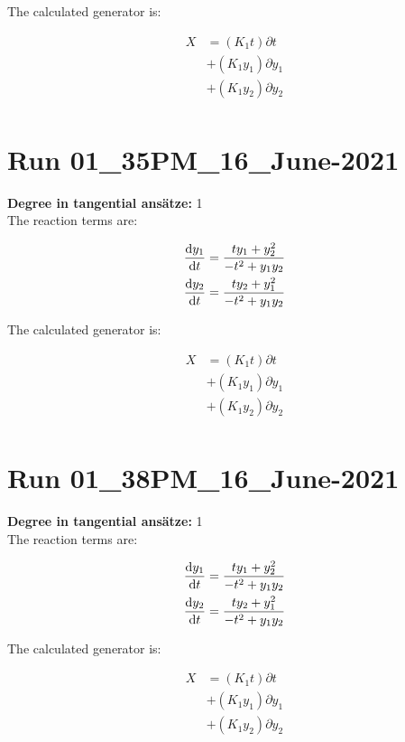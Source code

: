 The calculated generator is:

\begin{align*}
X&=\left(K_{1} t\right)\partial t\\&+\left(K_{1} y_{1}\right)\partial y_{1}\\&+\left(K_{1} y_{2}\right)\partial y_{2}\\\end{align*}
\section*{Run 01\_35PM\_16\_June-2021}
\textbf{Degree in tangential ansätze:}	1\\
The reaction terms are:

\begin{align*}
\dv{y_{1}}{t}&=\frac{t y_{1} + y_{2}^{2}}{- t^{2} + y_{1} y_{2}}\\
\dv{y_{2}}{t}&=\frac{t y_{2} + y_{1}^{2}}{- t^{2} + y_{1} y_{2}}\\
\end{align*}

The calculated generator is:

\begin{align*}
X&=\left(K_{1} t\right)\partial t\\&+\left(K_{1} y_{1}\right)\partial y_{1}\\&+\left(K_{1} y_{2}\right)\partial y_{2}\\\end{align*}
\section*{Run 01\_38PM\_16\_June-2021}
\textbf{Degree in tangential ansätze:}	1\\
The reaction terms are:

\begin{align*}
\dv{y_{1}}{t}&=\frac{t y_{1} + y_{2}^{2}}{- t^{2} + y_{1} y_{2}}\\
\dv{y_{2}}{t}&=\frac{t y_{2} + y_{1}^{2}}{- t^{2} + y_{1} y_{2}}\\
\end{align*}

The calculated generator is:

\begin{align*}
X&=\left(K_{1} t\right)\partial t\\&+\left(K_{1} y_{1}\right)\partial y_{1}\\&+\left(K_{1} y_{2}\right)\partial y_{2}\\\end{align*}
